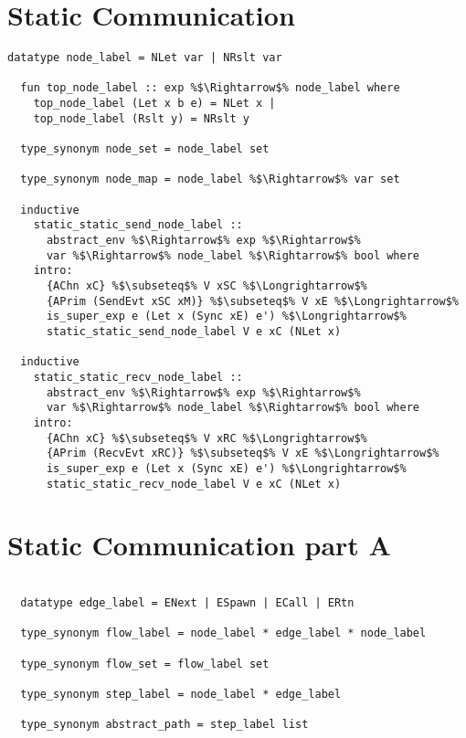 \documentclass{article}
\begin{document}
\section{Static Communication}
\begin{lstlisting}[style=codestyle1, escapechar=\%]
  datatype node_label = NLet var | NRslt var

  fun top_node_label :: exp %$\Rightarrow$% node_label where
    top_node_label (Let x b e) = NLet x |
    top_node_label (Rslt y) = NRslt y

  type_synonym node_set = node_label set

  type_synonym node_map = node_label %$\Rightarrow$% var set

  inductive
    static_static_send_node_label ::
      abstract_env %$\Rightarrow$% exp %$\Rightarrow$%
      var %$\Rightarrow$% node_label %$\Rightarrow$% bool where
    intro:
      {AChn xC} %$\subseteq$% V xSC %$\Longrightarrow$%
      {APrim (SendEvt xSC xM)} %$\subseteq$% V xE %$\Longrightarrow$%
      is_super_exp e (Let x (Sync xE) e') %$\Longrightarrow$%
      static_static_send_node_label V e xC (NLet x)

  inductive
    static_static_recv_node_label ::
      abstract_env %$\Rightarrow$% exp %$\Rightarrow$%
      var %$\Rightarrow$% node_label %$\Rightarrow$% bool where
    intro:
      {AChn xC} %$\subseteq$% V xRC %$\Longrightarrow$%
      {APrim (RecvEvt xRC)} %$\subseteq$% V xE %$\Longrightarrow$%
      is_super_exp e (Let x (Sync xE) e') %$\Longrightarrow$%
      static_static_recv_node_label V e xC (NLet x)

  \end{lstlisting}

\section{Static Communication part A}
\begin{lstlisting}[style=codestyle1, escapechar=\%]

  datatype edge_label = ENext | ESpawn | ECall | ERtn

  type_synonym flow_label = node_label * edge_label * node_label

  type_synonym flow_set = flow_label set

  type_synonym step_label = node_label * edge_label

  type_synonym abstract_path = step_label list
  \end{lstlisting}
\end{document}
